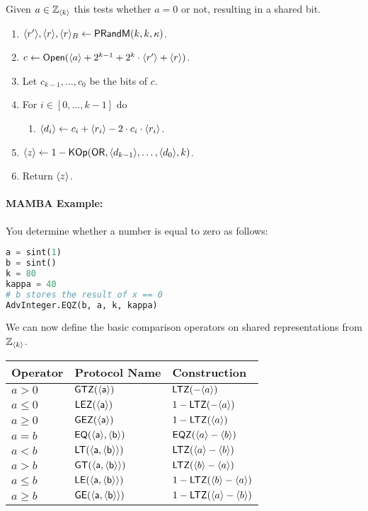 Given $a \in {\mathbb{Z}}_{\langle k \rangle}$ this tests whether $a=0$ or not,
resulting in a shared bit.
\begin{enumerate}
\item $\langle r' \rangle, \langle r \rangle, \langle r \rangle_B \leftarrow \mathsf{PRandM}(k,k,\kappa)$.
\item $c \leftarrow {\mathsf{Open}}(\langle a \rangle+2^{k-1}+2^k \cdot \langle r' \rangle+\langle r \rangle)$.
\item Let $c_{k-1},\ldots,c_0$ be the bits of $c$.
\item For $i \in [0,\ldots,k-1]$ do
\begin{enumerate}
   \item $\langle d_i \rangle \leftarrow c_i+\langle r_i \rangle-2 \cdot c_i \cdot \langle r_i \rangle$.
\end{enumerate}
\item $\langle z \rangle \leftarrow 1- \mathsf{KOp}(\mathsf{OR},\langle d_{k-1} \rangle,\ldots,\langle d_0 \rangle,k)$.
\item Return $\langle z \rangle$.
\end{enumerate}

\paragraph{MAMBA Example:} You determine whether a number is equal to zero as follows: 
\begin{lstlisting}[language={python}]
a = sint(1)
b = sint()
k = 80
kappa = 40
# b stores the result of x == 0
AdvInteger.EQZ(b, a, k, kappa)
\end{lstlisting}


We can now define the basic comparison operators on shared
representations from ${\mathbb{Z}}_{\langle k \rangle}$.
\begin{center}
\begin{tabular}{|lll|}
\hline
Operator & Protocol Name & Construction \\
\hline
$a>0$    & $\mathsf{GTZ(\langle a \rangle)}$           & $\mathsf{LTZ}(-\langle a \rangle)$ \\
$a\le0$  & $\mathsf{LEZ(\langle a \rangle)}$           & $1-\mathsf{LTZ}(-\langle a \rangle)$ \\
$a\ge0$  & $\mathsf{GEZ(\langle a \rangle)}$           & $1-\mathsf{LTZ}(\langle a \rangle)$ \\
$a=b$    & $\mathsf{EQ(\langle a \rangle,\langle b \rangle)}$ & $\mathsf{EQZ}(\langle a \rangle-\langle b \rangle)$ \\
$a<b$    & $\mathsf{LT(\langle a,\langle b \rangle \rangle)}$ & $\mathsf{LTZ}(\langle a \rangle-\langle b \rangle)$ \\
$a>b$    & $\mathsf{GT(\langle a,\langle b \rangle \rangle)}$ & $\mathsf{LTZ}(\langle b \rangle-\langle a \rangle)$ \\
$a\le b$ & $\mathsf{LE(\langle a,\langle b \rangle \rangle)}$ & $1-\mathsf{LTZ}(\langle b \rangle-\langle a \rangle)$ \\
$a\ge b$ & $\mathsf{GE(\langle a,\langle b \rangle \rangle)}$ & $1-\mathsf{LTZ}(\langle a \rangle-\langle b \rangle)$ \\
\hline
\end{tabular}
\end{center}


